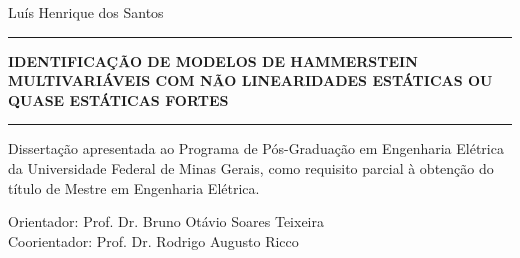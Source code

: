 \begin{titlepage}
	

	
	\vspace{0.75cm}
	\begin{center}
		{\normalsize Luís Henrique dos Santos}\\[7cm]
		
		\thickhrulefill
		\par\nobreak
		\vspace*{10\p@}%
		\hrule
		\vspace*{10\p@}%
		{\bf \normalsize \bfseries IDENTIFICAÇÃO DE MODELOS DE HAMMERSTEIN\\ MULTIVARIÁVEIS COM NÃO LINEARIDADES ESTÁTICAS OU\\ QUASE ESTÁTICAS FORTES}
		\vspace*{10\p@}%
		\hrule
		\vspace*{40\p@}%
		
		
	\end{center}
	
	
	\begin{flushright}
		\begin{minipage}{10cm} 
			{\normalsize Dissertação apresentada ao Programa de Pós-Graduação em Engenharia Elétrica da Universidade Federal de Minas Gerais, como requisito parcial à obtenção do título de Mestre em Engenharia Elétrica.}\\
		\end{minipage}
	\end{flushright}
	
	
	
	\begin{flushright}
		\begin{minipage}{10cm}
			{\normalsize Orientador: Prof. Dr. Bruno Otávio Soares Teixeira \\
			Coorientador: Prof. Dr. Rodrigo Augusto Ricco\\} 
		\end{minipage}
	\end{flushright}
	\vspace{6cm}
	

\end{titlepage}
